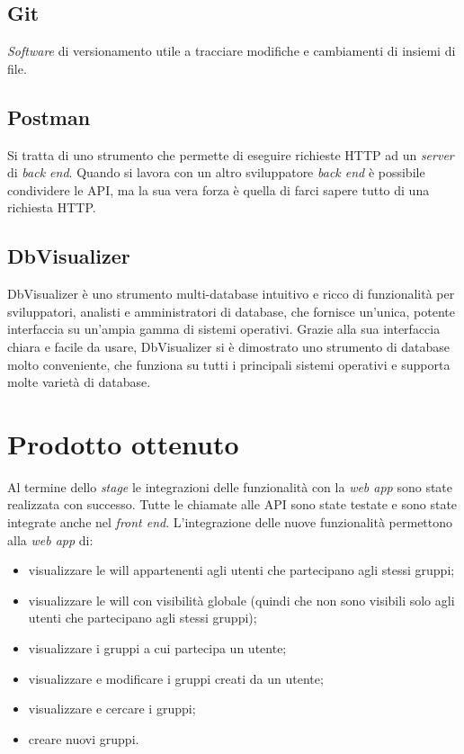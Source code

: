 \subsection{Git}
\textit{Software} di versionamento utile a tracciare modifiche e cambiamenti di insiemi di file.
\subsection{Postman}
Si tratta di uno strumento che permette di eseguire richieste HTTP ad un \textit{server} di \textit{back end}. Quando si lavora con un altro sviluppatore 
\textit{back end} è possibile condividere le \gls{API}, ma la sua vera forza è quella di farci sapere tutto di una richiesta HTTP.
\subsection{DbVisualizer}
DbVisualizer è uno strumento multi-database intuitivo e ricco di funzionalità per sviluppatori, analisti e amministratori di database, che fornisce 
un'unica, potente interfaccia su un'ampia gamma di sistemi operativi. Grazie alla sua interfaccia chiara e facile da usare, DbVisualizer si è dimostrato 
uno strumento di database molto conveniente, che funziona su tutti i principali sistemi operativi e supporta molte varietà di database. 


\section{Prodotto ottenuto}
Al termine dello \textit{stage} le integrazioni delle funzionalità con la \textit{web app} sono state realizzata con successo. Tutte le chiamate alle \gls{API} 
sono state testate e sono state integrate anche nel \textit{front end}. 
L'integrazione delle nuove funzionalità permettono alla \textit{web app} di: 
\begin{itemize}
    \item  visualizzare le \gls{will} appartenenti agli utenti che partecipano agli stessi 
    gruppi;
    \item visualizzare le \gls{will} con visibilità globale (quindi che non sono visibili solo agli utenti che partecipano agli stessi gruppi);
    \item visualizzare i gruppi a cui partecipa un utente;
    \item visualizzare e modificare i gruppi creati da un utente;
    \item visualizzare e cercare i gruppi;
    \item creare nuovi gruppi.
\end{itemize}
\pagebreak
